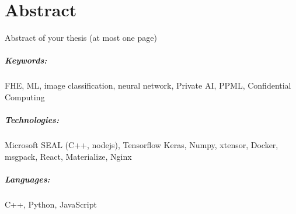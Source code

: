 \chapter*{Abstract}
Abstract of your thesis (at most one page)

\lipsum[1-3]

\paragraph{Keywords:}
FHE, ML, image classification, neural network,
Private AI, PPML, Confidential Computing

\paragraph{Technologies:}
Microsoft SEAL (C++, nodejs),
Tensorflow Keras,
Numpy,
xtensor,
Docker,
msgpack,
React,
Materialize,
Nginx

\paragraph{Languages:}
C++, Python, JavaScript
